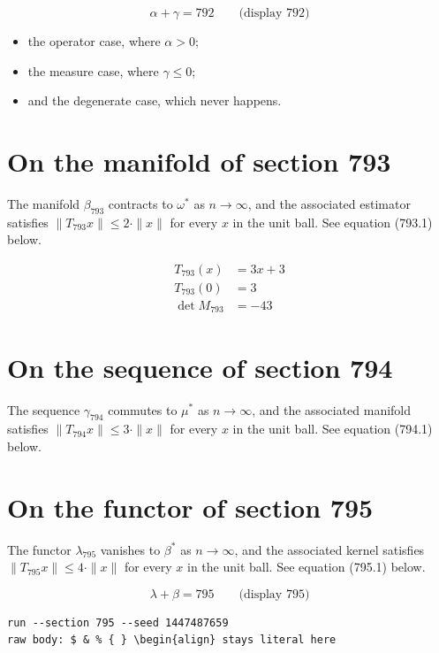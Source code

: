 \documentclass{article}
\begin{document}
$$
\alpha + \gamma = 792 \qquad \text{(display 792)}
$$

\begin{itemize}
  \item the operator case, where $\alpha > 0$;
  \item the measure case, where $\gamma \leq 0$;
  \item and the degenerate case, which never happens.
\end{itemize}

\section{On the manifold of section 793}
The manifold $\beta_{793}$ contracts to $\omega^{*}$ as $n \to \infty$,
and the associated estimator satisfies $\|T_{793} x\| \leq 2 \cdot \|x\|$
for every $x$ in the unit ball. See equation (793.1) below.

\begin{align}
T_{793}(x) &= 3 x + 3 \\
T_{793}(0) &= 3 \\
\det M_{793} &= -43
\end{align}

\section{On the sequence of section 794}
The sequence $\gamma_{794}$ commutes to $\mu^{*}$ as $n \to \infty$,
and the associated manifold satisfies $\|T_{794} x\| \leq 3 \cdot \|x\|$
for every $x$ in the unit ball. See equation (794.1) below.

\section{On the functor of section 795}
The functor $\lambda_{795}$ vanishes to $\beta^{*}$ as $n \to \infty$,
and the associated kernel satisfies $\|T_{795} x\| \leq 4 \cdot \|x\|$
for every $x$ in the unit ball. See equation (795.1) below.

$$
\lambda + \beta = 795 \qquad \text{(display 795)}
$$

\begin{verbatim}
run --section 795 --seed 1447487659
raw body: $ & % { } \begin{align} stays literal here
\end{verbatim}
\end{document}
